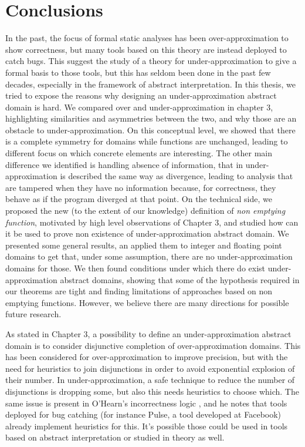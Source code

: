 \chapter{Conclusions}
In the past, the focus of formal static analyses has been over-approximation to show correctness, but many tools based on this theory are instead deployed to catch bugs. This suggest the study of a theory for under-approximation to give a formal basis to those tools, but this has seldom been done in the past few decades, especially in the framework of abstract interpretation.
In this thesis, we tried to expose the reasons why designing an under-approximation abstract domain is hard. We compared over and under-approximation in chapter 3, highlighting similarities and asymmetries between the two, and why those are an obstacle to under-approximation. On this conceptual level, we showed that there is a complete symmetry for domains while functions are unchanged, leading to different focus on which concrete elements are interesting. The other main difference we identified is handling absence of information, that in under-approximation is described the same way as divergence, leading to analysis that are tampered when they have no information because, for correctness, they behave as if the program diverged at that point.
On the technical side, we proposed the new (to the extent of our knowledge) definition of \textit{non emptying function}, motivated by high level observations of Chapter 3, and studied how can it be used to prove non existence of under-approximation abstract domain. We presented some general results, an applied them to integer and floating point domains to get that, under some assumption, there are no under-approximation domains for those. We then found conditions under which there do exist under-approximation abstract domains, showing that some of the hypothesis required in our theorems are tight and finding limitations of approaches based on non emptying functions.
However, we believe there are many directions for possible future research.

As stated in Chapter 3, a possibility to define an under-approximation abstract domain is to consider disjunctive completion of over-approximation domains. This has been considered for over-approximation\cite{file-disjunctive-completion} to improve precision, but with the need for heuristics to join disjunctions in order to avoid exponential explosion of their number.
In under-approximation, a safe technique to reduce the number of disjunctions is dropping some, but also this needs heuristics to choose which. The same issue is present in O'Hearn's incorrectness logic \cite{ohearn-incorrectness-logic}, and he notes that tools deployed for bug catching (for instance Pulse, a tool developed at Facebook) already implement heuristics for this. It's possible those could be used in tools based on abstract interpretation or studied in theory as well.

